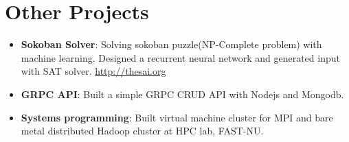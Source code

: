 \documentclass[letterpaper,11pt]{article}
\newcommand{\resumeItem}[2]{
\item\small{
\textbf{#1}{: #2 \vspace{-2pt}}
}
}
\newcommand{\resumeSubItem}[2]{\resumeItem{#1}{#2}\vspace{-4pt}}
\newcommand{\resumeSubHeadingListStart}{\begin{itemize}[leftmargin=*]}
\newcommand{\resumeSubHeadingListEnd}{\end{itemize}}
\begin{document}

\section{Other Projects}
\resumeSubHeadingListStart
\resumeSubItem{Sokoban Solver}
{Solving sokoban puzzle(NP-Complete problem) with machine learning. Designed a recurrent neural network and generated input with SAT solver. \href {http://thesai.org/Downloads/Volume8No3/Paper_64-Generation_of_Sokoban_Stages_using_Recurrent.pdf}{http://thesai.org}} 
\resumeSubItem{GRPC API}
{Built a simple GRPC CRUD API with Nodejs and Mongodb.}

\resumeSubItem{Systems programming}
{Built virtual machine cluster for MPI and bare metal distributed Hadoop cluster at HPC lab, FAST-NU.}
\resumeSubHeadingListEnd

%


\end{document}
